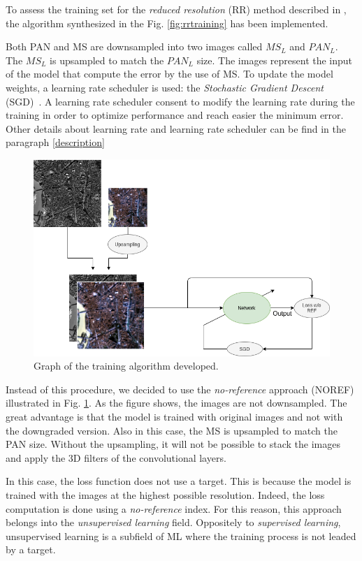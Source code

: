 \documentclass[12pt]{report}
\begin{document}
To assess the training set for the \textit{reduced resolution} (RR) method  described in \cite{pnn},
the algorithm synthesized in the Fig. \ref{fig:rrtraining} has been implemented.

Both PAN and MS are downsampled into two images called $MS_L$ and $PAN_L$.
The $MS_L$ is upsampled to match the $PAN_L$ size.
The images represent the input of the model that compute the error by the use of MS.
To update the model weights, a learning rate scheduler is used: the \textit{Stochastic Gradient Descent} (SGD)~\cite{sgd}.
A learning rate scheduler consent to modify the learning rate during the training
in order to optimize performance and reach easier the minimum error.
Other details about learning rate and learning rate scheduler can be find in the paragraph \ref{description}

\begin{figure}[t]
    \centering
    \includegraphics[scale=.45]{NOREFTraining.png}
    \caption{Graph of the training algorithm developed.}
    \label{fig:noreftraining}
\end{figure}

Instead of this procedure, we decided to use the \textit{no-reference} approach (NOREF) illustrated in Fig. \ref{fig:noreftraining}.
As the figure shows, the images are not downsampled. The great advantage is that 
the model is trained with original images and not with the downgraded version.
Also in this case, the MS is upsampled to match the PAN size.
Without the upsampling, it will not be possible to stack the images and apply the 3D filters of the convolutional layers.

In this case, the loss function does not use a target.
This is because the model is trained with the images at the highest possible resolution.
Indeed, the loss computation is done using a \textit{no-reference} index.
For this reason, this approach belongs into the \textit{unsupervised learning} field.
Oppositely to \textit{supervised learning}, unsupervised learning is a subfield of ML where the training process is not leaded by a target.
\end{document}
